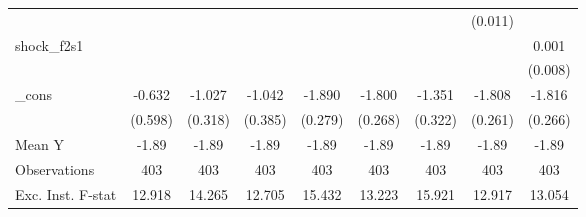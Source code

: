 {\begin{tabular}{l*{8}{c}}
            &                     &                     &                     &                     &                     &                     &     (0.011)         &                     \\
\addlinespace
shock\_f2s1  &                     &                     &                     &                     &                     &                     &                     &       0.001         \\
            &                     &                     &                     &                     &                     &                     &                     &     (0.008)         \\
\addlinespace
\_cons      &      -0.632         &      -1.027\sym{***}&      -1.042\sym{**} &      -1.890\sym{***}&      -1.800\sym{***}&      -1.351\sym{***}&      -1.808\sym{***}&      -1.816\sym{***}\\
            &     (0.598)         &     (0.318)         &     (0.385)         &     (0.279)         &     (0.268)         &     (0.322)         &     (0.261)         &     (0.266)         \\
\midrule
Mean Y      &       -1.89         &       -1.89         &       -1.89         &       -1.89         &       -1.89         &       -1.89         &       -1.89         &       -1.89         \\
Observations&         403         &         403         &         403         &         403         &         403         &         403         &         403         &         403         \\
Exc. Inst. F-stat&      12.918         &      14.265         &      12.705         &      15.432         &      13.223         &      15.921         &      12.917         &      13.054         \\
\bottomrule
\end{tabular}
}
